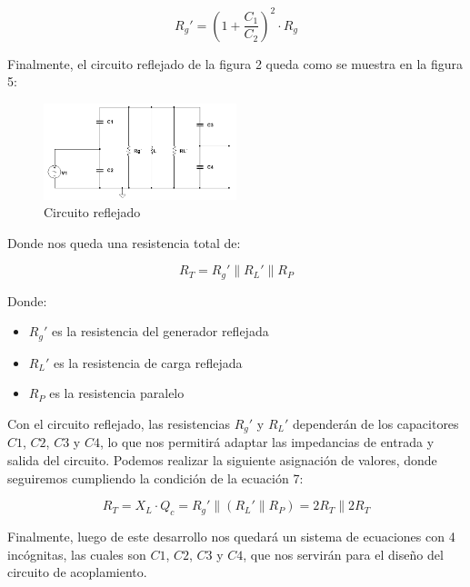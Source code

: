 \begin{equation}
    R_g' = (1 + \frac{C_1}{C_2})^2 \cdot R_g
\end{equation}

Finalmente, el circuito reflejado de la figura 2 queda como se muestra en la figura 5:

\begin{figure}[h]
    \centering
    \includegraphics[width=0.5\textwidth]{Imagenes/circuito_reflejado.png}
    \caption{Circuito reflejado}
\end{figure}

Donde nos queda una resistencia total de:

\begin{equation}
    R_T = R_g' \parallel R_L' \parallel R_P
\end{equation}

Donde:

\begin{itemize}
    \item $R_g'$ es la resistencia del generador reflejada
    \item $R_L'$ es la resistencia de carga reflejada
    \item $R_P$ es la resistencia paralelo
\end{itemize}

Con el circuito reflejado, las resistencias $R_g'$ y $R_L'$ dependerán de los capacitores $C1$, $C2$, $C3$ y $C4$, lo que nos permitirá adaptar las impedancias de entrada y salida del circuito.
Podemos realizar la siguiente asignación de valores, donde seguiremos cumpliendo la condición de la ecuación 7:

\begin{equation}
    R_T = X_L \cdot Q_c = R_g' \parallel (R_L' \parallel R_P) = 2 R_T \parallel 2 R_T 
\end{equation}

Finalmente, luego de este desarrollo nos quedará un sistema de ecuaciones con 4 incógnitas, las cuales son $C1$, $C2$, $C3$ y $C4$, que nos servirán para el diseño del circuito de acoplamiento.

